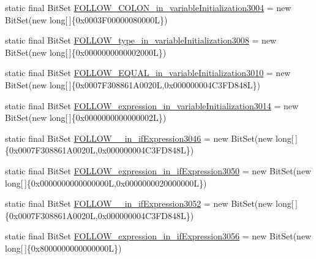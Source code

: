 \begin{DoxyCompactItemize}
static final Bit\-Set \hyperlink{classorg_1_1tzi_1_1use_1_1parser_1_1shell_1_1_shell_command_parser_a32b43c8b5e587d80c689c76f6dd6e892}{F\-O\-L\-L\-O\-W\-\_\-\-C\-O\-L\-O\-N\-\_\-in\-\_\-variable\-Initialization3004} = new Bit\-Set(new long\mbox{[}$\,$\mbox{]}\{0x0003\-F00000080000\-L\})
\item 
static final Bit\-Set \hyperlink{classorg_1_1tzi_1_1use_1_1parser_1_1shell_1_1_shell_command_parser_a4638b58c35eaa324899a1a59442f3017}{F\-O\-L\-L\-O\-W\-\_\-type\-\_\-in\-\_\-variable\-Initialization3008} = new Bit\-Set(new long\mbox{[}$\,$\mbox{]}\{0x0000000000002000\-L\})
\item 
static final Bit\-Set \hyperlink{classorg_1_1tzi_1_1use_1_1parser_1_1shell_1_1_shell_command_parser_a54e078f281c01f19e3f7acab475063de}{F\-O\-L\-L\-O\-W\-\_\-\-E\-Q\-U\-A\-L\-\_\-in\-\_\-variable\-Initialization3010} = new Bit\-Set(new long\mbox{[}$\,$\mbox{]}\{0x0007\-F308861\-A0020\-L,0x000000004\-C3\-F\-D848\-L\})
\item 
static final Bit\-Set \hyperlink{classorg_1_1tzi_1_1use_1_1parser_1_1shell_1_1_shell_command_parser_a8c3492fa7c1fbd7e25159b27ed0c3c3e}{F\-O\-L\-L\-O\-W\-\_\-expression\-\_\-in\-\_\-variable\-Initialization3014} = new Bit\-Set(new long\mbox{[}$\,$\mbox{]}\{0x0000000000000002\-L\})
\item 
static final Bit\-Set \hyperlink{classorg_1_1tzi_1_1use_1_1parser_1_1shell_1_1_shell_command_parser_a05c976987c40522f38f98f050accd05e}{F\-O\-L\-L\-O\-W\-\_\-\_\-in\-\_\-if\-Expression3046} = new Bit\-Set(new long\mbox{[}$\,$\mbox{]}\{0x0007\-F308861\-A0020\-L,0x000000004\-C3\-F\-D848\-L\})
\item 
static final Bit\-Set \hyperlink{classorg_1_1tzi_1_1use_1_1parser_1_1shell_1_1_shell_command_parser_a1999e71457be89ac060c43d1f6769b6e}{F\-O\-L\-L\-O\-W\-\_\-expression\-\_\-in\-\_\-if\-Expression3050} = new Bit\-Set(new long\mbox{[}$\,$\mbox{]}\{0x0000000000000000\-L,0x0000000020000000\-L\})
\item 
static final Bit\-Set \hyperlink{classorg_1_1tzi_1_1use_1_1parser_1_1shell_1_1_shell_command_parser_a02a948a74dfc3a226667dff5b9454001}{F\-O\-L\-L\-O\-W\-\_\-\_\-in\-\_\-if\-Expression3052} = new Bit\-Set(new long\mbox{[}$\,$\mbox{]}\{0x0007\-F308861\-A0020\-L,0x000000004\-C3\-F\-D848\-L\})
\item 
static final Bit\-Set \hyperlink{classorg_1_1tzi_1_1use_1_1parser_1_1shell_1_1_shell_command_parser_a2fc1c2991990af6f25a475712f7fccec}{F\-O\-L\-L\-O\-W\-\_\-expression\-\_\-in\-\_\-if\-Expression3056} = new Bit\-Set(new long\mbox{[}$\,$\mbox{]}\{0x8000000000000000\-L\})

\end{DoxyCompactItemize}

